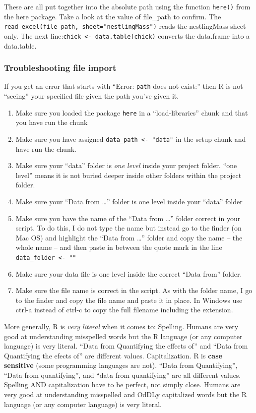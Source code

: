 \documentclass[]{book}
\providecommand{\tightlist}{%
  \setlength{\itemsep}{0pt}\setlength{\parskip}{0pt}}
\begin{document}
These are all put together into the absolute path using the function
\texttt{here()} from the here package. Take a look at the value of
file\_path to confirm. The
\texttt{read\_excel(file\_path,\ sheet="nestlingMass")} reads the
nestlingMass sheet only. The next
line:\texttt{chick\ \textless{}-\ data.table(chick)} converts the
data.frame into a data.table.

\subsubsection{Troubleshooting file
import}\label{troubleshooting-file-import}

If you get an error that starts with ``Error: \texttt{path} does not
exist:'' then R is not ``seeing'' your specified file given the path
you've given it.

\begin{enumerate}
\def\labelenumi{\arabic{enumi}.}
\tightlist
\item
  Make sure you loaded the package \texttt{here} in a ``load-libraries''
  chunk and that you have run the chunk
\item
  Make sure you have assigned \texttt{data\_path\ \textless{}-\ "data"}
  in the setup chunk and have run the chunk.
\item
  Make sure your ``data'' folder is \emph{one level} inside your project
  folder. ``one level'' means it is not buried deeper inside other
  folders within the project folder.
\item
  Make sure your ``Data from \ldots{}'' folder is one level inside your
  ``data'' folder
\item
  Make sure you have the name of the ``Data from \ldots{}'' folder
  correct in your script. To do this, I do not type the name but instead
  go to the finder (on Mac OS) and highlight the ``Data from \ldots{}''
  folder and copy the name -- the whole name -- and then paste in
  between the quote mark in the line
  \texttt{data\_folder\ \textless{}-\ ""}
\item
  Make sure your data file is one level inside the correct ``Data from''
  folder.
\item
  Make sure the file name is correct in the script. As with the folder
  name, I go to the finder and copy the file name and paste it in place.
  In Windows use ctrl-a instead of ctrl-c to copy the full filename
  including the extension.
\end{enumerate}

More generally, R is \emph{very literal} when it comes to: Spelling.
Humans are very good at understanding misspelled words but the R
language (or any computer language) is very literal. ``Data from
Quantifying the effects of'' and ``Data from Quantifying the efects of''
are different values. Capitalization. R is \textbf{case sensitive} (some
programming languages are not). ``Data from Quantifying'', ``Data from
quantifying'', and ``data from quantifying'' are all different values.
Spelling AND capitalization have to be perfect, not simply close. Humans
are very good at understanding misspelled and OdDLy capitalized words
but the R language (or any computer language) is very literal.
\end{document}
